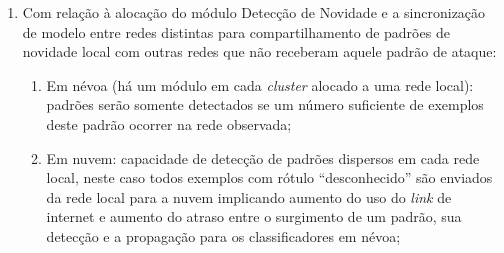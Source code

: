 \begin{enumerate}
  
  \item Com relação à alocação do módulo Detecção de Novidade e a sincronização de
  modelo entre redes distintas para compartilhamento de padrões de novidade local
  com outras redes que não receberam aquele padrão de ataque:
  \begin{enumerate}
    
    \item Em névoa (há um módulo em cada \emph{cluster} alocado a uma rede local):
    padrões serão somente detectados se um número suficiente de exemplos deste
    padrão
    ocorrer na rede observada;
    

    \item Em nuvem: capacidade de detecção de padrões dispersos em cada rede
    local,
    neste caso todos exemplos com rótulo ``desconhecido''  são enviados da rede
    local para a nuvem implicando aumento do uso do \emph{link} de internet e
    aumento do atraso entre o surgimento de um padrão, sua detecção e a propagação
    para os classificadores em névoa;


\end{enumerate}
\end{enumerate}
